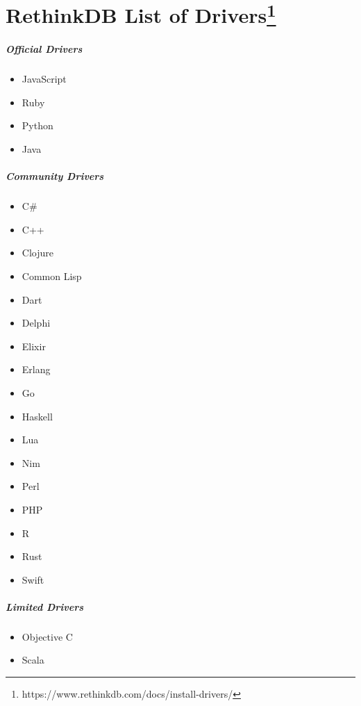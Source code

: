 \chapter[RethinkDB List of Drivers]{RethinkDB List of Drivers\footnote{https://www.rethinkdb.com/docs/install-drivers/}}\label{appendix:rethinkdb:listofdrivers}
\paragraph{Official Drivers}

\begin{itemize}
    \itemsep0em
    \item JavaScript
    \item Ruby
    \item Python
    \item Java
\end{itemize}

\paragraph{Community Drivers}

\begin{itemize}
    \itemsep0em
    \item C\#
    \item C++
    \item Clojure
    \item Common Lisp
    \item Dart
    \item Delphi
    \item Elixir
    \item Erlang
    \item Go
    \item Haskell
    \item Lua
    \item Nim
    \item Perl
    \item PHP
    \item R
    \item Rust
    \item Swift
\end{itemize}

\paragraph{Limited Drivers}

\begin{itemize}
    \itemsep0em
    \item Objective C
    \item Scala
\end{itemize}